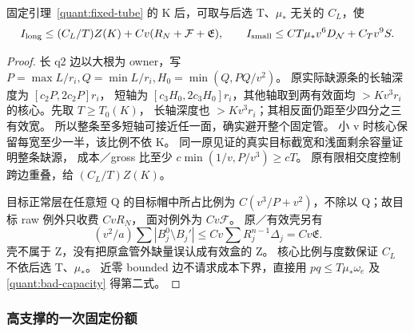 \begin{lemma}[长角及近零角]\label{quant:long-small}
固定引理~\ref{quant:fixed-tube} 的 K 后，可取与后选
T、\(\mu_*\) 无关的 \(C_L\)，使
\[
 I_{\rm long}\le(C_L/T)Z(K)+Cv(R_N+\mathcal F+\mathfrak E),
 \qquad
 I_{\rm small}\le CT\mu_*v^6D_{\mathcal N}+C_Tv^9S.
\]
\end{lemma}
\begin{proof}
长 q2 边以大根为 owner，写
\(P=\max L/r_i,Q=\min L/r_i,H_0=\min(Q,PQ/v^2)\)。
原实际缺源条的长轴深度为 \([c_2P,2c_2P]r_i\)，
短轴为 \([c_3H_0,2c_3H_0]r_i\)，其他轴取到两有效面均
\(>Kv^3r_i\) 的核心。先取 \(T\ge T_0(K)\)，
长轴深度也 \(>Kv^3r_i\)；其相反面仍距至少四分之三有效宽。
所以整条至多短轴可接近任一面，确实避开整个固定管。
小 v 时核心保留每宽至少一半，该比例不依 K。
同一原见证的真实目标截宽和浅面剩余容量证明整条缺源，
成本／gross 比至少 \(c\min(1/v,P/v^3)\ge cT\)。
原有限相交度控制跨边重叠，给 \((C_L/T)Z(K)\)。

目标正常层在任意短 Q 的目标帽中所占比例为
\(C(v^3/P+v^2)\)，不除以 Q；故目标 raw 例外只收费 \(CvR_N\)，
面对例外为 \(Cv\mathcal F\)。
原／有效壳另有
\[
 (v^2/a)\sum|B_j^0\setminus B_j'|
 \le Cv\sum R_j^{n-1}\Delta_j=Cv\mathfrak E.
\]
壳不属于 Z，没有把原盒管外缺量误认成有效盒的 Z。
核心比例与度数保证 \(C_L\) 不依后选 T、\(\mu_*\)。
近零 bounded 边不请求成本下界，直接用
\(pq\le T\mu_*\omega_e\) 及 \eqref{quant:bad-capacity} 得第二式。
\end{proof}

\subsubsection{高支撑的一次固定份额}

